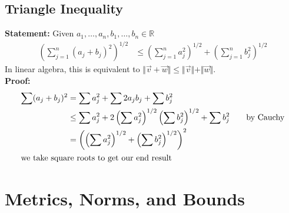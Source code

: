 \documentclass[10pt]{extarticle}
\newcommand{\R}{\mathbb{R}}
\begin{document}
    \subsection{Triangle Inequality}%
    \textbf{Statement:} Given $a_1,\dots,a_n,b_1,\dots,b_n\in\R$
    \begin{align*}
      \left(\sum_{j=1}^{n}(a_j + b_j)^2\right)^{1/2} &\leq \left(\sum_{j=1}^{n}a_j^2\right)^{1/2} + \left(\sum_{j=1}^{n}b_j^2\right)^{1/2}
    \end{align*}
    In linear algebra, this is equivalent to $\Vert\vec{v} + \vec{w}\Vert \leq \Vert\vec{v}\Vert + \Vert\vec{w}\Vert$.\\

    \textbf{Proof:}
    \begin{align*}
      \sum (a_j + b_j)^2 &= \sum a_j^2 + \sum 2a_jb_j + \sum b_j^2\\
                         &\leq \sum a_j^2 + 2\left(\sum a_j^2\right)^{1/2}\left(\sum b_j^2\right)^{1/2} + \sum b_j^2\tag*{by Cauchy}\\
                         &= \left(\left(\sum a_j^2\right)^{1/2} + \left(\sum b_j^2\right)^{1/2} \right)^2\\
                         \shortintertext{we take square roots to get our end result}
    \end{align*}
  \section{Metrics, Norms, and Bounds}%
\end{document}
